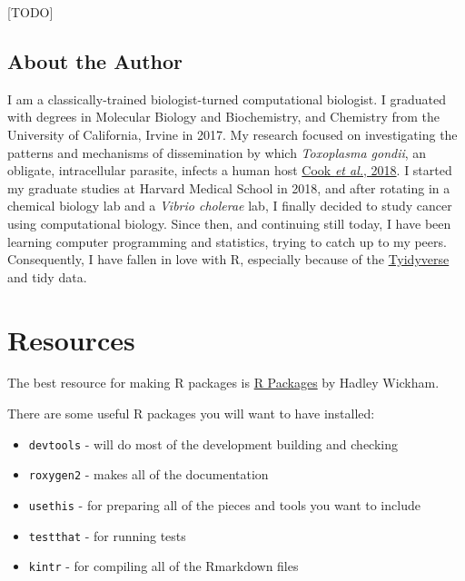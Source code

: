 \documentclass[]{book}
\providecommand{\tightlist}{%
  \setlength{\itemsep}{0pt}\setlength{\parskip}{0pt}}
\begin{document}
{[}TODO{]}

\hypertarget{about-the-author}{%
\subsection*{About the Author}\label{about-the-author}}

I am a classically-trained biologist-turned computational biologist. I graduated with degrees in Molecular Biology and Biochemistry, and Chemistry from the University of California, Irvine in 2017. My research focused on investigating the patterns and mechanisms of dissemination by which \emph{Toxoplasma gondii}, an obligate, intracellular parasite, infects a human host \href{https://www.ncbi.nlm.nih.gov/pubmed/29295815}{Cook \emph{et al.}, 2018}. I started my graduate studies at Harvard Medical School in 2018, and after rotating in a chemical biology lab and a \emph{Vibrio cholerae} lab, I finally decided to study cancer using computational biology. Since then, and continuing still today, I have been learning computer programming and statistics, trying to catch up to my peers. Consequently, I have fallen in love with R, especially because of the \href{https://www.tidyverse.org}{Tyidyverse} and tidy data.

\hypertarget{resources}{%
\section*{Resources}\label{resources}}

The best resource for making R packages is \href{http://r-pkgs.had.co.nz}{R Packages} by Hadley Wickham.

There are some useful R packages you will want to have installed:

\begin{itemize}
\tightlist
\item
  \texttt{devtools} - will do most of the development building and checking
\item
  \texttt{roxygen2} - makes all of the documentation
\item
  \texttt{usethis} - for preparing all of the pieces and tools you want to include
\item
  \texttt{testthat} - for running tests
\item
  \texttt{kintr} - for compiling all of the Rmarkdown files
\end{itemize}
\end{document}
